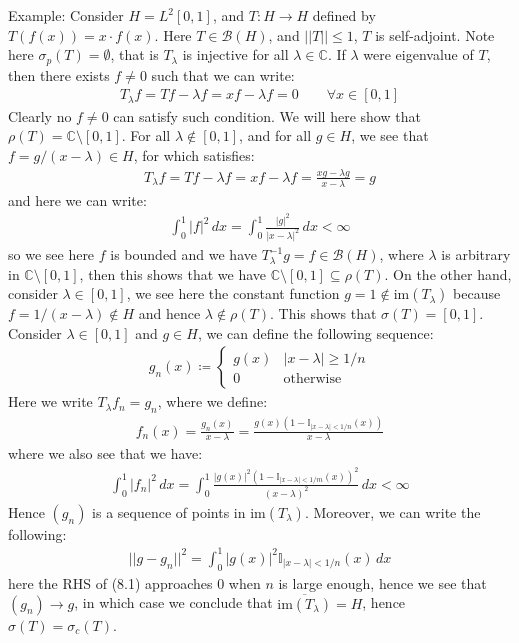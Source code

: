 \documentclass[11pt]{book}
\theoremstyle{break}
\theoremstyle{break}
\newcommand{\C}{\mathbb{C}}
\newcommand{\im}{\text{im}}
\newcommand{\example}{\color{green}Example: \color{black}}
\begin{document}
\example Consider $H = L^2[0,1]$, and $T:H \to H$ defined by $T(f(x)) = x\cdot f(x)$. Here $T \in \mathcal{B}(H)$, and $||T||\leq 1$, $T$ is self-adjoint. Note here $\sigma_p(T) = \emptyset$, that is $T_{\lambda}$ is injective for all $\lambda \in \C$. If $\lambda$ were eigenvalue of $T$, then there exists $f \neq 0$ such that we can write:
\begin{align*}
T_{\lambda}f = Tf - \lambda f = xf-\lambda f = 0 \qquad \forall x \in [0,1]
\end{align*}
Clearly no $f \neq 0$ can satisfy such condition. We will here show that $\rho(T) = \C\setminus [0,1]$. For all $\lambda \notin [0,1]$, and for all $g \in H$, we see that $f = g/(x-\lambda) \in H$, for which satisfies:
\begin{align*}
T_\lambda f = T f - \lambda f = xf - \lambda f = \frac{xg - \lambda g}{x-\lambda} = g
\end{align*}
and here we can write:
\begin{align*}
\int_0^1 |f|^2 \, dx = \int_0^1 \frac{|g|^2}{|x-\lambda|^2}\, dx < \infty
\end{align*}
so we see here $f$ is bounded and we have $T_{\lambda}^{-1}g = f \in \mathcal{B}(H)$, where $\lambda$ is arbitrary in $\C\setminus [0,1]$, then this shows that we have $\C \setminus [0,1] \subseteq \rho(T)$. On the other hand, consider $\lambda \in [0,1]$, we see here the constant function $g=1 \notin \im(T_{\lambda})$ because $f = 1/(x-\lambda) \notin H$ and hence $\lambda \notin \rho(T)$. This shows that $\sigma(T) = [0,1] $. Consider $\lambda \in [0,1]$ and $g \in H$, we can define the following sequence:
\begin{align*}
g_n(x) \coloneqq \begin{cases} g(x) & |x-\lambda|\geq 1/n \\ 0 & \text{otherwise}\end{cases}
\end{align*}
Here we write $T_{\lambda}f_n = g_n$, where we define:
\begin{align*}
f_n(x) = \frac{g_n(x)}{x-\lambda} = \frac{g(x) \left(1- \mathbb{I}_{|x-\lambda|<1/n}(x)\right)}{x-\lambda}
\end{align*}
where we also see that we have:
\begin{align*}
\int_0^1 |f_n|^2 \, dx = \int_0^1 \frac{|g(x)|^2 \left( 1-\mathbb{I}_{|x-\lambda|<1/m}(x)\right)^2}{(x-\lambda)^2}\, dx < \infty
\end{align*}
Hence $(g_n) $ is a sequence of points in $\im(T_{\lambda})$. Moreover, we can write the following:
\begin{align}
||g-g_n||^2 = \int_0^1 |g(x)|^2 \mathbb{I}_{|x-\lambda| <1/n}(x) \, dx
\end{align}
here the RHS of (8.1) approaches $0$ when $n$ is large enough, hence we see that $(g_n) \to g$, in which case we conclude that $\overline{\im(T_{\lambda})} = H$, hence $\sigma(T) = \sigma_c(T)$. 
\end{document}
